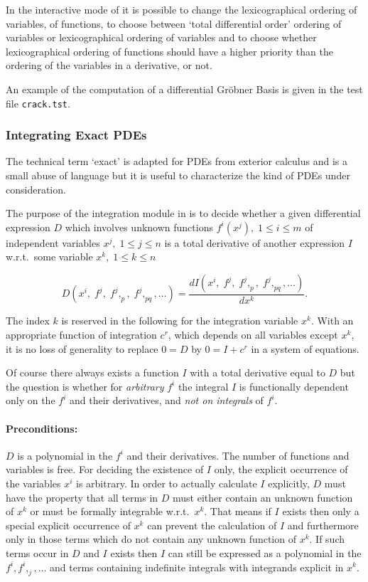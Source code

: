 In the interactive mode of  it is possible to change
the lexicographical ordering of variables, of functions, to choose
between `total differential order' ordering of variables or
lexicographical ordering of variables and to choose whether
lexicographical ordering of functions should have a higher priority
than the ordering of the variables in a derivative, or not.

An example of the computation of a differential Gr\"{o}bner Basis is
given in the test file \texttt{crack.tst}.

\subsubsection{Integrating Exact PDEs}

The technical term `exact' is adapted for PDEs from exterior calculus
and is a small abuse of language but it is useful to characterize the
kind of PDEs under consideration.

The purpose of the integration module in  is to decide
whether a given differential expression $D$ which involves unknown
functions $f^i(x^j),\; 1\leq i\leq m$ of independent variables $x^j,\;
1\leq j\leq n$ is a total derivative of another expression $I$
w.r.t.\ some variable $x^k,\; 1\leq k\leq n$

\[ D(x^i,\; f^j,\; f^j,_p,\; f^j,_{pq}, \ldots)
     = \frac{d I(x^i,\; f^j,\; f^j,_p,\; f^j,_{pq}, \ldots)}{d x^k}. \]

The index $k$ is reserved in the following for the integration
variable $x^k$.  With an appropriate function of integration $c^r$,
which depends on all variables except $x^k$, it is no loss of
generality to replace $0 = D$ by $0 = I + c^r$ in a system of
equations.

Of course there always exists a function $I$ with a total derivative
equal to $D$ but the question is whether for \emph{arbitrary} $f^i$
the integral $I$ is functionally dependent only on the $f^i$ and their
derivatives, and \emph{not on integrals} of $f^i$.

\paragraph*{Preconditions:}

$D$ is a polynomial in the $f^i$ and their derivatives.  The number of
functions and variables is free.  For deciding the existence of $I$
only, the explicit occurrence of the variables $x^i$ is arbitrary.  In
order to actually calculate $I$ explicitly, $D$ must have the property
that all terms in $D$ must either contain an unknown function of $x^k$
or must be formally integrable w.r.t.\ $x^k.$ That means if $I$ exists
then only a special explicit occurrence of $x^k$ can prevent the
calculation of $I$ and furthermore only in those terms which do not
contain any unknown function of $x^k$.  If such terms occur in $D$ and
$I$ exists then $I$ can still be expressed as a polynomial in the
$f^i, f^i,_j, \ldots$ and terms containing indefinite integrals with
integrands explicit in $x^k$.


